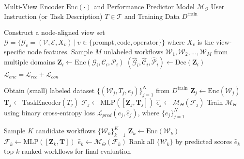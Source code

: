 \renewcommand{\algorithmiccomment}[1]{\textcolor{gray}{$\triangleright$ #1}}
\renewcommand{\algorithmicrequire}{\textbf{Initialization:}}
\renewcommand{\algorithmicensure}{\textbf{Input:}}

\begin{algorithm}[hbt]
\caption{Overall Procedure of \ours{}} \label{alg:pseudo_code}
\begin{algorithmic}[1]
\Require Multi-View Encoder $\mathrm{Enc(\cdot)}$ and Performance Predictor Model $\mathcal{M}_{\Theta}$
\Ensure User Instruction (or Task Description) $T \in \mathcal{T}$ and Training Data $D^{\text{train}}$

\State {}
\State Construct a node-aligned view set $\mathcal{G} = \{\mathcal{G}_v =(\mathcal{V}, \mathcal{E}, X_v )~\vert~ v\in \{\text{prompt}, \text{code}, \text{operator}\}\}$ where $X_v$ is the view-specific node features.
\State {}
\State Sample $M$ unlabeled workflows $\mathcal{W}_1, \mathcal{W}_2, ..., \mathcal{W}_M$ from multiple domains
    \State $\mathbf{Z}_i \gets \mathrm{Enc}(\mathcal{G}_i, \mathcal{C}_i, \mathcal{P}_i)$ \hfill{}
    \State $(\hat{\mathcal{G}}_i, \hat{\mathcal{C}}_i, \hat{\mathcal{P}}_i) \gets \mathrm{Dec}(\mathbf{Z}_i)$ \hfill{}
\EndFor
\State $\mathcal{L}_{enc} = \mathcal{L}_{rec} + \mathcal{L}_{con}$ \hfill{}

\State {}
\State Obtain (small) labeled dataset $\{(\mathcal{W}_j, T_j, e_j)\}_{j=1}^N$ from $D^{\text{train}}$
    \State $\mathbf{Z}_j \gets \mathrm{Enc}(\mathcal{W}_j)$ \hfill{}
    \State $\mathbf{T}_j \gets \text{TaskEncoder}(T_j)$ \hfill{}
    \State $\mathcal{F}_j \gets \mathrm{MLP}([\mathbf{Z}_j, \mathbf{T}_j])$ \hfill{}
    \State $\hat{e}_j \gets \mathcal{M}_{\Theta}(\mathcal{F}_j)$ \hfill{}
\EndFor
\State Train $\mathcal{M}_{\Theta}$ using binary cross-entropy loss $\mathcal{L}_{pred}(e_j, \hat{e}_j)$, where $\{e_j\}_{j=1}^N$

\State {}
\State Sample $K$ candidate workflows $\{\mathcal{W}_k\}_{k=1}^K$
    \State $\mathbf{Z}_k \gets \mathrm{Enc}(\mathcal{W}_k)$ \hfill{}
    \State $\mathcal{F}_k \gets \mathrm{MLP}([\mathbf{Z}_k, \mathbf{T}])$ \hfill{}
    \State $\hat{e}_k \gets \mathcal{M}_{\Theta}(\mathcal{F}_k)$ \hfill{}
\EndFor
\State Rank all $\{\mathcal{W}_k\}$ by predicted scores $\hat{e}_k$
\State \Return top-$k$ ranked workflows for final evaluation


\end{algorithmic}
\end{algorithm}
